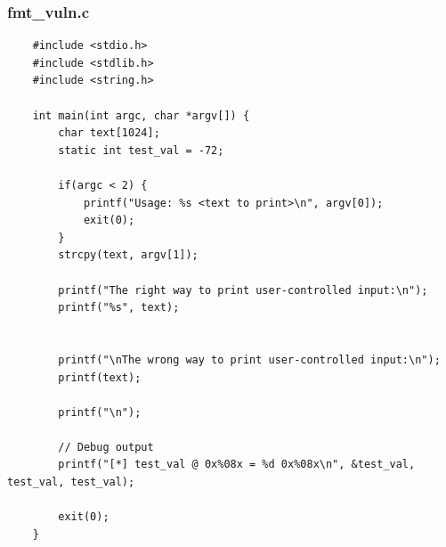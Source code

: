 \documentclass[11pt, a4paper]{article}
\begin{document}
\subsubsection{fmt\_vuln.c}
\begin{lstlisting}
	#include <stdio.h>
	#include <stdlib.h>
	#include <string.h>
	
	int main(int argc, char *argv[]) {
		char text[1024];
		static int test_val = -72;
		
		if(argc < 2) {
			printf("Usage: %s <text to print>\n", argv[0]);
			exit(0);
		}
		strcpy(text, argv[1]);
		
		printf("The right way to print user-controlled input:\n");
		printf("%s", text);
		
		
		printf("\nThe wrong way to print user-controlled input:\n");
		printf(text);
		
		printf("\n");
		
		// Debug output
		printf("[*] test_val @ 0x%08x = %d 0x%08x\n", &test_val, test_val, test_val);
		
		exit(0);
	}
\end{lstlisting}



\newpage
\printbibliography
\newpage
\printglossaries
\end{document}
